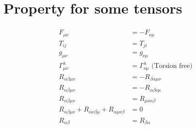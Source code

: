 \documentclass[12pt]{article}
\theoremstyle{mystyle}{\newtheorem{definition}{Definition}[section]}
\theoremstyle{mystyle}{\newtheorem{theorem}[definition]{Theorem}}
\theoremstyle{mystyle}{\newtheorem*{remark}{Remark}}
\theoremstyle{mystyle}{\newtheorem*{example}{Example}}
\theoremstyle{mystyle}{\newtheorem*{examples}{Examples}}
\theoremstyle{cstyle}{\newtheorem*{cthm}{}}
\begin{document}
\section{Property for some tensors}
\begin{align*}
  \begin{split}
    F_{\mu\nu} &= - F_{\nu\mu}\\
    T_{ij} &= T_{ji}\\
    g_{\mu\nu} &= g_{\nu\mu}\\
    \Gamma ^{\lambda}_{\mu\nu} &= \Gamma^{\lambda}_{\nu\mu} \text{ (Torsion free)}\\
    R_{\alpha\beta\mu\nu} &= -R_{\beta\alpha\mu\nu}\\
    R_{\alpha\beta\mu\nu} &= -R_{\alpha\beta\nu\mu}\\
    R_{\alpha\beta\mu\nu} &= R_{\mu\nu\alpha\beta}\\
    R_{\alpha\beta\mu\nu} + R_{\alpha\nu\beta\mu} + R_{\alpha\mu\nu\beta} &= 0 \\
    R_{\alpha\beta} &= R_{\beta\alpha}
  \end{split}
\end{align*}
\end{document}
